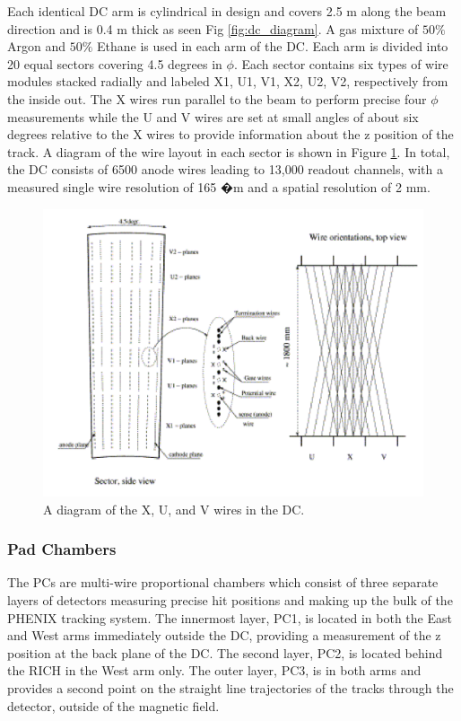 Each identical DC arm is cylindrical in design and covers 2.5 m along the beam direction and is 0.4 m thick as seen Fig \ref{fig:dc_diagram}. A gas mixture of $50\%$ Argon and $50\%$ Ethane is used in each arm of the DC. Each arm is divided into 20 equal sectors covering 4.5 degrees in $\phi$. Each sector contains six types of wire modules stacked radially and labeled X1, U1, V1, X2, U2, V2, respectively from the inside out. The X wires run parallel to the beam to perform precise four $\phi$ measurements while the U and V wires are set at small angles of about six degrees relative to the X wires to provide information about the z position of the track. A diagram of the wire layout in each sector is shown in Figure \ref{fig:dc_wire_diagram}. In total, the DC consists of 6500 anode wires leading to 13,000 readout channels, with a measured single wire resolution of 165 �m and a spatial resolution of  2 mm.
\begin{figure}[!h]
\begin{center}
\includegraphics[width=0.55\linewidth]{figs/dc_wire_diagram.png}
\caption{A diagram of the X, U, and V wires in the DC.}\label{fig:dc_wire_diagram}
\end{center}
\end{figure}

\subsubsection{Pad Chambers}
The PCs are multi-wire proportional chambers which consist of three separate layers of detectors measuring precise hit positions and making up the bulk of the PHENIX tracking system. The innermost layer, PC1, is located in both the East and West arms immediately outside the DC, providing a measurement of the z position at the back plane of the DC. The second layer, PC2, is located behind the RICH in the West arm only. The outer layer, PC3, is in both arms and provides a second point on the straight line trajectories of the tracks through the detector, outside of the magnetic field.
